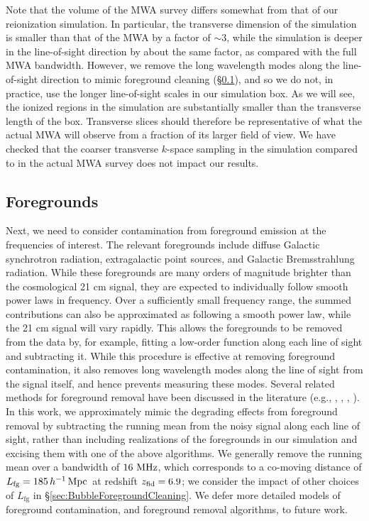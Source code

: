 Note that the volume of the MWA survey differs somewhat from that
of our reionization simulation. In particular, the transverse dimension
of the simulation is smaller than that of the MWA by a factor of $\sim 3$, while the simulation
is deeper in the line-of-sight direction by about the same factor, as compared with the full MWA bandwidth. However, we remove
the long wavelength modes along the line-of-sight direction to mimic foreground
cleaning (\S \ref{sec:Bubbleforegrounds}), and so we do not, in practice, use the longer line-of-sight scales in our simulation
box. As we will see, the ionized regions in the simulation are substantially
smaller than the transverse length of the box. Transverse slices should therefore
be representative of what the actual MWA will observe from a fraction of its 
larger
field of view. We have checked that the coarser transverse $k$-space sampling in the simulation
compared to in the actual MWA survey does not impact our results.


\subsection{Foregrounds} \label{sec:Bubbleforegrounds}


Next, we need to consider contamination from foreground emission 
at the frequencies of interest. The relevant foregrounds include
diffuse Galactic synchrotron radiation, extragalactic point
sources, and Galactic Bremsstrahlung radiation. While these
foregrounds are many orders of magnitude brighter than the
cosmological 21 cm signal, they are expected to individually follow
smooth power laws in frequency. Over a sufficiently small frequency range,
the summed contributions can also be approximated as
following a smooth power law, while the 21 cm signal will vary
rapidly. This allows the foregrounds to be removed from the data
by, for example, fitting a low-order function along each line of sight and subtracting
it. While this procedure is effective at removing foreground contamination, it also removes long wavelength
modes along the line of sight from the signal itself, and hence prevents measuring these modes. 
Several related methods for foreground removal have been discussed in the
literature (e.g., \citealt{Wang:2005zj},
\citealt{Harker:2009hg}, \citealt{Petrovic:2010me},
\citealt{Chapman:2012yj}). In this work, we approximately mimic the
degrading effects from foreground removal by subtracting the running
mean from the noisy signal along each line of sight, rather than
including realizations of the foregrounds in our simulation and excising
them with one of the above algorithms.
We generally remove the running mean over a bandwidth of $16\ \text{MHz}$, which corresponds
to a co-moving distance of $L_{\text{fg}} = 185\,h^{-1}\,{\rm Mpc}\,$ at redshift $z_{\rm fid} = 6.9$; we consider the impact of other choices of $L_{\text{fg}}$ in \S \ref{sec:BubbleForegroundCleaning}.
We defer more detailed models of foreground contamination, and foreground
removal algorithms, to future work.




